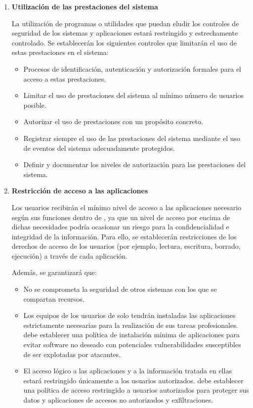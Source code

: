 \begin{enumerate}[label=\alph*)]
    \item \textbf{Utilización de las prestaciones del sistema}

    La utilización de programas o utilidades que puedan eludir los controles de seguridad de los sistemas y aplicaciones estará restringido y estrechamente controlado. Se establecerán los siguientes controles que limitarán el uso de estas prestaciones en el sistema:

    \begin{itemize}
        \item Procesos de identificación, autenticación y autorización formales para el acceso a estas prestaciones.
        \item Limitar el uso de prestaciones del sistema al mínimo número de usuarios posible.
        \item Autorizar el uso de prestaciones con un propósito concreto.
        \item Registrar siempre el uso de las prestaciones del sistema mediante el uso de eventos del sistema adecuadamente protegidos.
        \item Definir y documentar los niveles de autorización para las prestaciones del sistema.
    \end{itemize}

    \item \textbf{Restricción de acceso a las aplicaciones}

    Los usuarios recibirán el mínimo nivel de acceso a las aplicaciones necesario según sus funciones dentro de \Beneficiario{}, ya que un nivel de acceso por encima de dichas necesidades podría ocasionar un riesgo para la confidencialidad e integridad de la información. Para ello, se establecerán restricciones de los derechos de acceso de los usuarios (por ejemplo, lectura, escritura, borrado, ejecución) a través de cada aplicación.

    Además, se garantizará que:
    \begin{itemize}
        \item No se comprometa la seguridad de otros sistemas con los que se compartan recursos.
        \item Los equipos de los usuarios de \Beneficiario{} solo tendrán instaladas las aplicaciones estrictamente necesarias para la realización de sus tareas profesionales. \Beneficiario{} debe establecer una política de instalación mínima de aplicaciones para evitar software no deseado con potenciales vulnerabilidades susceptibles de ser explotadas por atacantes.
        \item El acceso lógico a las aplicaciones y a la información tratada en ellas estará restringido únicamente a los usuarios autorizados. \Beneficiario{} debe establecer una política de acceso restringido a usuarios autorizados para proteger sus datos y aplicaciones de accesos no autorizados y exfiltraciones.
    \end{itemize}


\end{enumerate}
